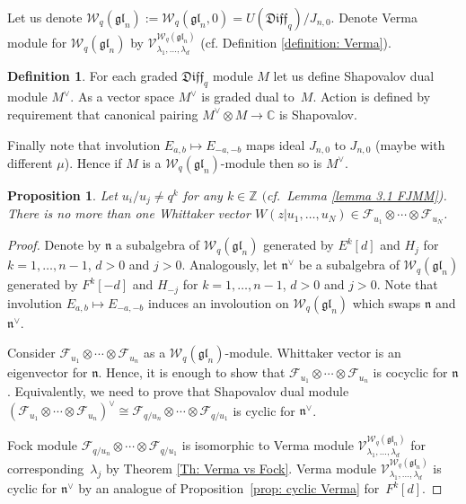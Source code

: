 \documentclass[pdftex]{sigma}
\numberwithin{equation}{section}
\newtheorem{Proposition}[Theorem]{Proposition}
\theoremstyle{definition}
\newtheorem{Definition}[Theorem]{Definition}
\newcommand{\qD}{\mathfrak{Diff}_q}
\newcommand{ \Wgl }{ \mathcal{W}_{q} ( \mathfrak{gl}_n ) }
\newcommand{\VerglNT}{\mathcal{V}^{\Wgl}_{\lambda_1, \dots, \lambda_d} }
\begin{document}
Let us denote $\Wgl := \mathcal{W}_{q}(\mathfrak{gl}_n,0)= U(\qD)/J_{n,0}$. Denote Verma module for $\Wgl$ by $\VerglNT$ (cf. Definition \ref{definition: Verma}).

\begin{Definition}For each graded $\qD$ module $M$ let us define Shapovalov dual module $M^{\vee}$. As a vector space $M^{\vee}$ is graded dual to~$M$. Action is defined by requirement that canonical pairing $M^{\vee} \otimes M \rightarrow \mathbb{C}$ is Shapovalov.
\end{Definition}

Finally note that involution $E_{a,b} \mapsto E_{-a,-b}$ maps ideal $J_{n,0}$ to $J_{n,0}$ (maybe with different $\mu$). Hence if $M$ is a $\Wgl$-module then so is $M^{\vee}$.

\begin{Proposition} \label{cor:Whit uniquness}
Let $u_i/u_j \neq q^k$ for any $k \in \mathbb{Z}$ $($cf.\ Lemma {\rm \ref{lemma 3.1 FJMM})}. There is no more than one Whittaker vector $W(z|u_1, \dots, u_N) \in \mathcal{F}_{u_1} \otimes \cdots \otimes \mathcal{F}_{u_N}$.
\end{Proposition}
\begin{proof}Denote by $\mathfrak{n}$ a subalgebra of $\Wgl$ generated by $E^k[d]$ and $H_j$ for $k=1, \dots, n-1$, $d > 0$ and $j>0$. Analogously, let $\mathfrak{n}^{\vee}$ be a subalgebra of $\Wgl$ generated by $F^k[-d]$ and $H_{-j}$ for $k=1, \dots, n-1$, $d > 0$ and $j>0$. Note that involution $E_{a,b} \mapsto E_{-a,-b}$ induces an involoution on $\Wgl$ which swaps $\mathfrak{n}$ and $\mathfrak{n}^{\vee}$.

Consider $\mathcal{F}_{u_1} \otimes \cdots \otimes \mathcal{F}_{u_n}$ as a $\Wgl$-module. Whittaker vector is an eigenvector for $\mathfrak{n}$. Hence, it is enough to show that $\mathcal{F}_{u_1} \otimes \cdots \otimes \mathcal{F}_{u_n}$ is cocyclic for $\mathfrak{n}$. Equivalently, we need to prove that Shapovalov dual module $ ( \mathcal{F}_{u_1} \otimes \cdots \otimes \mathcal{F}_{u_n})^{\vee} \cong \mathcal{F}_{q/u_n} \otimes \cdots \otimes \mathcal{F}_{q/u_1}$ is cyclic for $\mathfrak{n}^{\vee}$.

Fock module $\mathcal{F}_{q/u_n} \otimes \cdots \otimes \mathcal{F}_{q/u_1}$ is isomorphic to Verma module $\VerglNT$ for corresponding~$\lambda_j$ by Theorem \ref{Th: Verma vs Fock}. Verma module $\VerglNT$ is cyclic for $\mathfrak{n}^{\vee}$ by an analogue of Proposition~\ref{prop: cyclic Verma} for~$F^k[d]$.
\end{proof}
\end{document}

